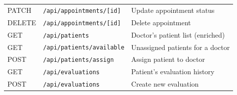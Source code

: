 \documentclass[12pt,a4paper]{report}
\begin{document}
\begin{longtable}{L{1.5cm} L{5.5cm} L{7.5cm}}
  PATCH & \texttt{/api/appointments/[id]}        & Update appointment status \\
  DELETE& \texttt{/api/appointments/[id]}        & Delete appointment \\
  GET   & \texttt{/api/patients}                 & Doctor's patient list (enriched) \\
  GET   & \texttt{/api/patients/available}       & Unassigned patients for a doctor \\
  POST  & \texttt{/api/patients/assign}          & Assign patient to doctor \\
  GET   & \texttt{/api/evaluations}              & Patient's evaluation history \\
  POST  & \texttt{/api/evaluations}              & Create new evaluation \\
\end{longtable}
\end{document}
